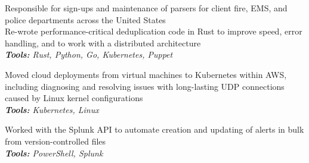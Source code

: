 \documentclass[10pt,letter]{altacv}
\begin{document}

\begin{fullwidth}
\marginpar{\makesidebarheader}
    \vspace*{-1\baselineskip}
\makecvheader
\end{fullwidth}


Responsible for sign-ups and maintenance of parsers for client fire, EMS, and police departments across the United States \\
Re-wrote performance-critical deduplication code in Rust to improve speed, error handling, and to work with a distributed architecture \\
\textit{\textbf{Tools:} Rust, Python, Go, Kubernetes, Puppet}

\divider

Moved cloud deployments from virtual machines to Kubernetes within AWS, including diagnosing and resolving issues with long-lasting UDP connections caused by Linux kernel configurations \\
\textit{\textbf{Tools:} Kubernetes, Linux}

\divider

Worked with the Splunk API to automate creation and updating of alerts in bulk from version-controlled files \\
\textit{\textbf{Tools:} PowerShell, Splunk}
\end{document}
